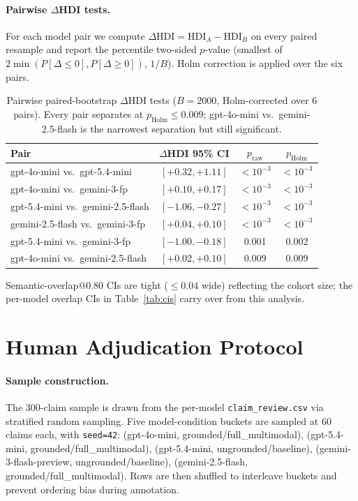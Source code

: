 \documentclass{article}
\theoremstyle{plain}
\begin{document}
\paragraph{Pairwise $\Delta$HDI tests.} For each model pair we compute $\Delta\text{HDI} = \text{HDI}_A - \text{HDI}_B$ on every paired resample and report the percentile two-sided $p$-value (smallest of $2 \min(P[\Delta \leq 0], P[\Delta \geq 0])$, $1/B$). Holm correction is applied over the six pairs.

\begin{table}[h]
\centering
\small
\setlength{\tabcolsep}{4pt}
\begin{tabular}{lccc}
\toprule
\textbf{Pair} & \textbf{$\Delta$HDI 95\% CI} & \textbf{$p_{\text{raw}}$} & \textbf{$p_{\text{Holm}}$} \\
\midrule
gpt-4o-mini vs.\ gpt-5.4-mini           & $[+0.32, +1.11]$ & $<10^{-3}$ & $<10^{-3}$ \\
gpt-4o-mini vs.\ gemini-3-fp            & $[+0.10, +0.17]$ & $<10^{-3}$ & $<10^{-3}$ \\
gpt-5.4-mini vs.\ gemini-2.5-flash      & $[-1.06, -0.27]$ & $<10^{-3}$ & $<10^{-3}$ \\
gemini-2.5-flash vs.\ gemini-3-fp       & $[+0.04, +0.10]$ & $<10^{-3}$ & $<10^{-3}$ \\
gpt-5.4-mini vs.\ gemini-3-fp           & $[-1.00, -0.18]$ & 0.001 & 0.002 \\
gpt-4o-mini vs.\ gemini-2.5-flash       & $[+0.02, +0.10]$ & 0.009 & 0.009 \\
\bottomrule
\end{tabular}
\caption{Pairwise paired-bootstrap $\Delta$HDI tests ($B{=}2000$, Holm-corrected over 6 pairs). Every pair separates at $p_{\text{Holm}} \leq 0.009$; gpt-4o-mini vs.\ gemini-2.5-flash is the narrowest separation but still significant.}
\label{tab:pairs}
\end{table}

Semantic-overlap@0.80 CIs are tight ($\leq 0.04$ wide) reflecting the cohort size; the per-model overlap CIs in Table~\ref{tab:cis} carry over from this analysis.

\section{Human Adjudication Protocol}
\label{app:adjudication}

\paragraph{Sample construction.} The 300-claim sample is drawn from the per-model \texttt{claim\_review.csv} via stratified random sampling. Five model-condition buckets are sampled at 60 claims each, with \texttt{seed=42}: (gpt-4o-mini, grounded/full\_multimodal), (gpt-5.4-mini, grounded/full\_multimodal), (gpt-5.4-mini, ungrounded/baseline), (gemini-3-flash-preview, ungrounded/baseline), (gemini-2.5-flash, grounded/full\_multimodal). Rows are then shuffled to interleave buckets and prevent ordering bias during annotation.
\end{document}
